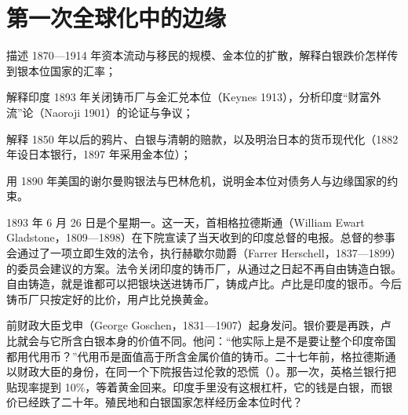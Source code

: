 \chapter{第一次全球化中的边缘}\label{ch:periphery}

\begin{chapterguide}
\begin{guidegoals}
\item 描述 1870—1914 年资本流动与移民的规模、金本位的扩散，解释白银跌价怎样传到银本位国家的汇率；
\item 解释印度 1893 年关闭铸币厂与金汇兑本位（Keynes 1913），分析印度“财富外流”论（Naoroji 1901）的论证与争议；
\item 解释 1850 年以后的鸦片、白银与清朝的赔款，以及明治日本的货币现代化（1882 年设日本银行，1897 年采用金本位）；
\item 用 1890 年美国的谢尔曼购银法与巴林危机，说明金本位对债务人与边缘国家的约束。
\end{guidegoals}
\end{chapterguide}

1893 年 6 月 26 日是个星期一。这一天，首相格拉德斯通（William Ewart Gladstone，1809—1898）在下院宣读了当天收到的印度总督的电报\cite{hansard1893,hansardpeople}。总督的参事会通过了一项立即生效的法令，执行赫歇尔勋爵（Farrer Herschell，1837—1899）的委员会建议的方案\cite{hansard1893,hansardpeople24}。法令关闭印度的铸币厂，从通过之日起不再自由铸造白银\cite{hansard1893}。自由铸造，就是谁都可以把银块送进铸币厂，铸成卢比。卢比是印度的银币。今后铸币厂只按定好的比价，用卢比兑换黄金\cite{hansard1893}。

前财政大臣戈申（George Goschen，1831—1907）起身发问\cite{hansard1893,hansardpeople}。银价要是再跌，卢比就会与它所含白银本身的价值不同\cite{hansard1893}。他问：“他实际上是不是要让整个印度帝国都用代用币？”\cite{hansard1893}代用币是面值高于所含金属价值的铸币。二十七年前，格拉德斯通以财政大臣的身份，在同一个下院报告过伦敦的恐慌（）。那一次，英格兰银行把贴现率提到 10\%，等着黄金回来。印度手里没有这根杠杆，它的钱是白银，而银价已经跌了二十年。殖民地和白银国家怎样经历金本位时代？

